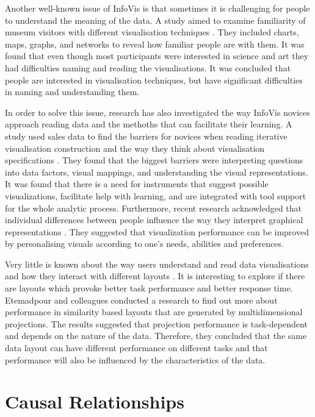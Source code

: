 \documentclass{l4proj}
\begin{document}
Another well-known issue of InfoVis is that sometimes it is challenging for people to understand the meaning of the data. A study aimed to examine familiarity of museum visitors with different visualisation techniques \cite{borner2015investigating}. They included charts, maps, graphs, and networks to reveal how familiar people are with them. It was found that even though most participants were interested in science and art they had difficulties naming and reading the visualisations. It was concluded that people are interested in visualisation techniques, but have significant difficulties in naming and understanding them. 

In order to solve this issue, research has also investigated the way InfoVis novices approach reading data and the methoths that can facilitate their learning. A study used sales data to find the barriers for novices when reading iterative visualisation construction and the way they think about visualisation specifications \cite{grammel2010information}. They found that the biggest barriers were interpreting questions into data factors, visual mappings, and understanding the visual representations. It was found that there is a need for instruments that suggest possible visualizations, facilitate help with learning, and are integrated with tool support for the whole analytic process. Furthermore, recent research acknowledged that individual differences between people influence the way they interpret graphical representations \cite{Steichen:2013:UIV:2449396.2449439}. They suggested that visualization performance can be improved by personalising visuals according to one's needs, abilities and preferences.

Very little is known about the way users understand and read data visualisations and how they interact with different layouts \cite{etemadpour2015perception}. It is interesting to explore if there are layouts which provoke better task performance and better response time. Etemadpour and colleagues \cite{etemadpour2015perception} conducted a research to find out more about performance in similarity based layouts that are generated by multidimensional projections. The results suggested that projection performance is task-dependent and depends on the nature of the data. Therefore, they concluded that the same data layout can have different performance on different tasks and that performance will also be influenced by the characteristics of the data.

\section{Causal Relationships}
\end{document}
